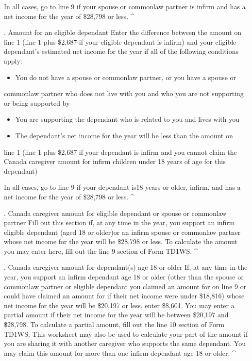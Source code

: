 \documentclass[letterpaper,10pt,english]{sphinxmanual}
\begin{document}
\sphinxAtStartPar
In all cases, go to line 9 if your spouse or common\sphinxhyphen{}law partner is infirm and
has a net income for the year of \$28,798 or less. \textasciicircum{}

. Amount for an eligible dependant \sphinxhyphen{} Enter the difference between the amount
on line 1 (line 1 plus \$2,687 if your eligible dependant is infirm) and your
eligible dependant’s estimated net income for the year if all of the
following conditions apply:
\begin{itemize}
\item {} 
\sphinxAtStartPar
You do not have a spouse or common\sphinxhyphen{}law partner, or you have a spouse or

\end{itemize}

\sphinxAtStartPar
common\sphinxhyphen{}law partner who does not live with you and who you are not supporting
or being supported by
\begin{itemize}
\item {} 
\sphinxAtStartPar
You are supporting the dependant who is related to you and lives with you

\item {} 
\sphinxAtStartPar
The dependant’s net income for the year will be less than the amount on

\end{itemize}

\sphinxAtStartPar
line 1 (line 1 plus \$2,687 if your dependant is infirm and you cannot claim
the Canada caregiver amount for infirm children under 18 years of age for
this dependant)

\sphinxAtStartPar
In all cases, go to line 9 if your dependant is18 years or older, infirm, and
has a net income for the year of \$28,798 or less. \textasciicircum{}

. Canada caregiver amount for eligible dependant or spouse or common\sphinxhyphen{}law
partner \sphinxhyphen{} Fill out this section if, at any time in the year, you support an
infirm eligible dependant (aged 18 or older)or an infirm spouse or common\sphinxhyphen{}law
partner whose net income for the year will be \$28,798 or less. To calculate
the amount you may enter here, fill out the line 9 section of Form TD1\sphinxhyphen{}WS. \textasciicircum{}

. Canada caregiver amount for dependant(s) age 18 or older \sphinxhyphen{} If, at any
time in the year, you support an infirm dependant age 18 or older (other than
the spouse or common\sphinxhyphen{}law partner or eligible dependant you claimed an amount
for on line 9 or could have claimed an amount for if their net income were
under \$18,816) whose net income for the year will be \$20,197 or less, enter
\$8,601. You may enter a partial amount if their net income for the year will
be between \$20,197 and \$28,798. To calculate a partial amount, fill out the
line 10 section of Form TD1\sphinxhyphen{}WS. This worksheet may also be used to calculate
your part of the amount if you are sharing it with another caregiver who
supports the same dependant. You may claim this amount for more than one
infirm dependant age 18 or older. \textasciicircum{}
\end{document}
